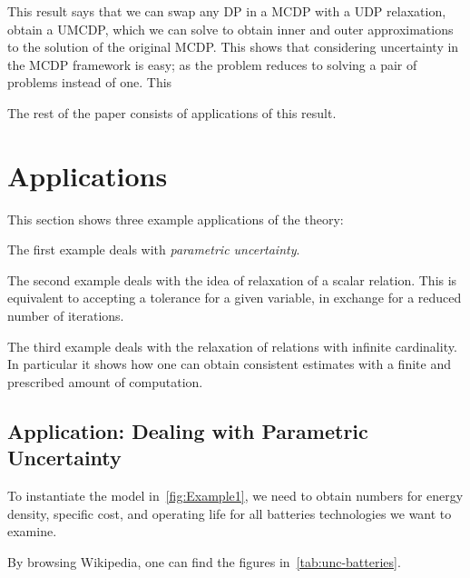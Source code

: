 This result says that we can swap any DP in a MCDP with a UDP relaxation,
obtain a UMCDP, which we can solve to obtain inner and outer approximations
to the solution of the original MCDP. This shows that considering
uncertainty in the MCDP framework is easy; as the problem reduces
to solving a pair of problems instead of one. This

The rest of the paper consists of applications of this result.


\section{Applications\label{sec:Applications}}

This section shows three example applications of the theory:
\begin{compactenum}
    \item The first example deals with \emph{parametric uncertainty}.
    \item The second example deals with the idea of relaxation of a scalar relation.
    This is equivalent to accepting a tolerance for a given variable,
    in exchange for a reduced number of iterations.
    \item The third example deals with the relaxation of relations with infinite
    cardinality. In particular it shows how one can obtain consistent
    estimates with a finite and prescribed amount of computation.
\end{compactenum}


\subsection{Application: Dealing with Parametric Uncertainty\label{sec:Application-uncertainty}}

To instantiate the model in~\cref{fig:Example1}, we need to
obtain numbers for energy density, specific cost, and operating life
for all batteries technologies we want to examine.

By browsing Wikipedia, one can find the figures in~\cref{tab:unc-batteries}.

